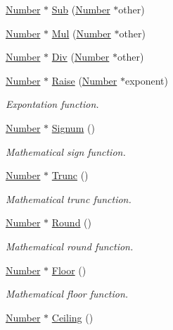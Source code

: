 \begin{DoxyCompactItemize}
\item 
\hyperlink{structNumber}{Number} $\ast$ \hyperlink{structRealNumber_a16eae9fed4e18d72e80d72b3b3f2ef89}{Sub} (\hyperlink{structNumber}{Number} $\ast$other)
\item 
\hyperlink{structNumber}{Number} $\ast$ \hyperlink{structRealNumber_af5491d836bb591e1291f4f9eee809902}{Mul} (\hyperlink{structNumber}{Number} $\ast$other)
\item 
\hyperlink{structNumber}{Number} $\ast$ \hyperlink{structRealNumber_a3c9c011cae6212d4b233f4933cd81bd6}{Div} (\hyperlink{structNumber}{Number} $\ast$other)
\item 
\hyperlink{structNumber}{Number} $\ast$ \hyperlink{structRealNumber_aaf9c066a4b9e9d845edefd40f614a517}{Raise} (\hyperlink{structNumber}{Number} $\ast$exponent)
\begin{DoxyCompactList}\small\item\em Expontation function. \end{DoxyCompactList}\item 
\hyperlink{structNumber}{Number} $\ast$ \hyperlink{structRealNumber_a9c3f6b9bff23ed16f4fce328cd184bcd}{Signum} ()
\begin{DoxyCompactList}\small\item\em Mathematical sign function. \end{DoxyCompactList}\item 
\hyperlink{structNumber}{Number} $\ast$ \hyperlink{structRealNumber_aba1f2eea0099d4c1347cd97b2897c0d8}{Trunc} ()
\begin{DoxyCompactList}\small\item\em Mathematical trunc function. \end{DoxyCompactList}\item 
\hyperlink{structNumber}{Number} $\ast$ \hyperlink{structRealNumber_ac8668b36e44ba33ba8fb986347d48bc0}{Round} ()
\begin{DoxyCompactList}\small\item\em Mathematical round function. \end{DoxyCompactList}\item 
\hyperlink{structNumber}{Number} $\ast$ \hyperlink{structRealNumber_a2b6019c5638bac355924e4b26d60e82a}{Floor} ()
\begin{DoxyCompactList}\small\item\em Mathematical floor function. \end{DoxyCompactList}\item 
\hyperlink{structNumber}{Number} $\ast$ \hyperlink{structRealNumber_ad3d56323d395a89928c66c0ed4d087f8}{Ceiling} ()

\end{DoxyCompactItemize}
